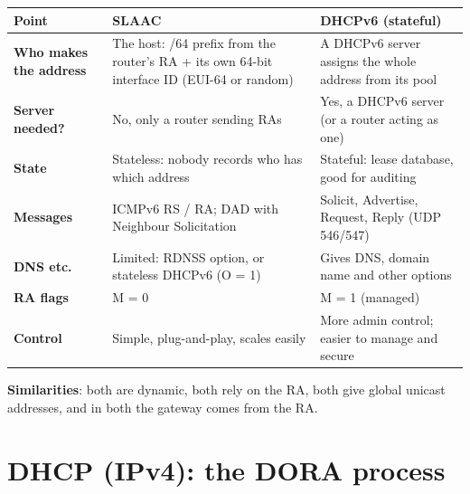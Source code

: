 \documentclass[10pt]{article}
\begin{document}
\begin{ans}
\small
\begin{tabularx}{\linewidth}{@{}>{\bfseries}p{2.2cm}XX@{}}
\toprule
Point & SLAAC & DHCPv6 (stateful)\\\midrule
Who makes the address & The host: /64 prefix from the router's RA + its own 64-bit interface ID (EUI-64 or random) & A DHCPv6 server assigns the whole address from its pool\\
Server needed? & No, only a router sending RAs & Yes, a DHCPv6 server (or a router acting as one)\\
State & Stateless: nobody records who has which address & Stateful: lease database, good for auditing\\
Messages & ICMPv6 RS / RA; DAD with Neighbour Solicitation & Solicit, Advertise, Request, Reply (UDP 546/547)\\
DNS etc. & Limited: RDNSS option, or stateless DHCPv6 (O = 1) & Gives DNS, domain name and other options\\
RA flags & M = 0 & M = 1 (managed)\\
Control & Simple, plug-and-play, scales easily & More admin control; easier to manage and secure\\
\bottomrule
\end{tabularx}
\textbf{Similarities}: both are dynamic, both rely on the RA, both give global unicast addresses, and in both the gateway comes from the RA.
\end{ans}

\section{DHCP (IPv4): the DORA process}
\end{document}
